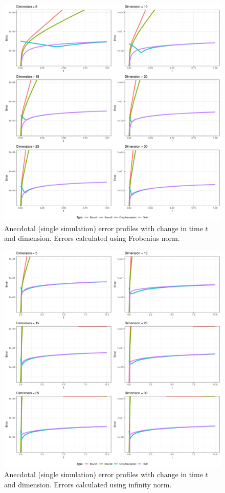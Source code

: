 \documentclass[12pt]{article} %
\begin{document}
\begin{figure}[!p]
	\centering
	\includegraphics[width=\linewidth]{frobeniusScaling.pdf}
	\caption{Anecdotal (single simulation) error profiles with change in time $t$ and dimension. Errors calculated using Frobenius norm.}\label{fig:frob}
\end{figure}

\begin{figure}[!p]
	\centering
	\includegraphics[width=\linewidth]{infinityScaling.pdf}
	\caption{Anecdotal (single simulation) error profiles with change in time $t$ and dimension. Errors calculated using infinity norm.}\label{fig:inf}
\end{figure}





\end{document}
